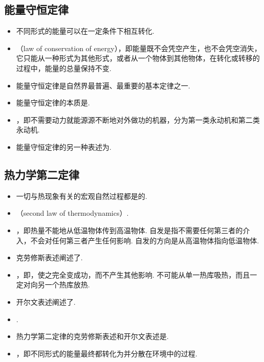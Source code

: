 \subsection{能量守恒定律}
\vspace{10pt}
\begin{itemize}
\item 不同形式的能量可以在一定条件下相互转化.
\item {}（law of conservation of energy），即能量既不会凭空产生，也不会凭空消失，它只能从一种形式为其他形式，或者从一个物体到其他物体，在转化或转移的过程中，能量的总量保持不变.
\item 能量守恒定律是自然界最普遍、最重要的基本定律之一.
\item 能量守恒定律的本质是.
\item {}，即不需要动力就能源源不断地对外做功的机器，分为第一类永动机和第二类永动机.
\item 能量守恒定律的另一种表述为.
\end{itemize}

\subsection{热力学第二定律}
\vspace{10pt}
\begin{itemize}
\item 一切与热现象有关的宏观自然过程都是的.
\item {}（second law of thermodynamics）.
\item {}，即热量不能地从低温物体传到高温物体. 自发是指不需要任何第三者的介入，不会对任何第三者产生任何影响. 自发的方向是从高温物体指向低温物体.
\item 克劳修斯表述阐述了.
\item {}，即，使之完全变成功，而不产生其他影响. 不可能从单一热库吸热，而且一定对向另一个热库放热.
\item 开尔文表述阐述了.
\item {}.
\item 热力学第二定律的克劳修斯表述和开尔文表述是.
\item {}，即不同形式的能量最终都转化为并分散在环境中的过程.
\end{itemize}